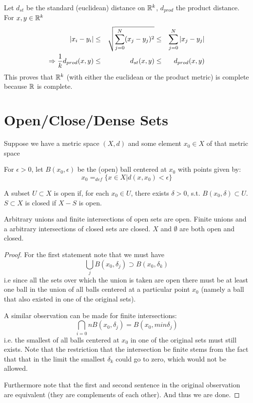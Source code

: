 Let $d_{st}$ be the standard (euclidean) distance on $\mathbb{R}^k$, $d_{prod}$ the product distance. For $x,y\in\mathbb{R}^k$
\begin{align} 
|x_i-y_i| &\leq& \sqrt{\sum\limits_{j=0}^N (x_j-y_j)^2} &\leq& \sum\limits_{j=0}^N |x_j-y_j| \\
\Rightarrow \frac{1}{k}d_{prod}(x,y)&\leq& d_{st}(x,y)&\leq& d_{prod}(x,y)
\end{align}
This proves that $\mathbb{R}^k$ (with either the euclidean or the product metric) is complete because $\mathbb{R}$ is complete.
\section*{Open/Close/Dense Sets}
Suppose we have a metric space $(X,d)$ and some element $x_0 \in X$ of that metric space
\begin{mydef}
For $\epsilon > 0$, let $B(x_0,\epsilon)$ be the (open) ball centered at $x_0$ with points given by:
\[ x_0 =_{def} \{x\in X | d(x,x_0)<\epsilon \} \]
\end{mydef}
\begin{mydef}
 A subset $U\subset X$ is open if, for each $x_0\in U$, there exists $\delta>0$, s.t. $B(x_0,\delta)\subset U$. $S\subset X$ is closed if $X-S$ is open.
\end{mydef}
\begin{obs}
Arbitrary unions and finite intersections of open sets are open. Finite unions and a arbitrary intersections of closed sets are closed. $X$ and $\emptyset$ are both open and closed.
\begin{proof}
For the first statement note that we must have
\[ \bigcup_j B(x_0,\delta_j) \supset B(x_0,\delta_k) \]
i.e since all the sets over which the union is taken are open there must be at least one ball in the union of all balls centered at a particular point $x_0$ (namely a ball that also existed in one of the original sets). \par
A similar observation can be made for finite intersections:
\[ \bigcap_{i=0}{n} B(x_0,\delta_j) = B(x_0, min \delta_j) \]
i.e. the smallest of all balls centered at $x_0$ in one of the original sets must still exists. Note that the restriction that the intersection be finite stems from the fact that that in the limit the smallest $\delta_k$ could go to zero, which would not be allowed. \par
Furthermore note that the first and second sentence in the original observation are equivalent (they are complements of each other). And thus we are done.
\end{proof}
\end{obs}
